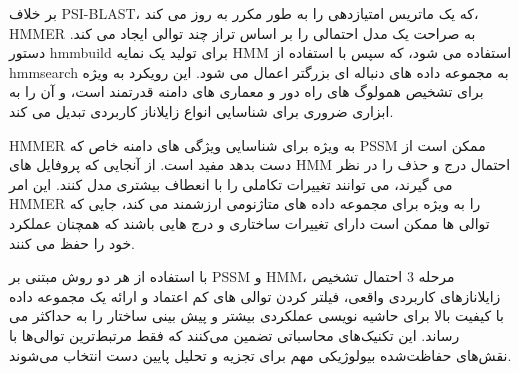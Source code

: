             بر خلاف PSI-BLAST، که یک ماتریس امتیازدهی را به طور مکرر به روز می کند، HMMER به صراحت یک مدل احتمالی را بر اساس تراز چند توالی ایجاد می کند. دستور hmmbuild برای تولید یک نمایه HMM استفاده می شود، که سپس با استفاده از hmmsearch به مجموعه داده های دنباله ای بزرگتر اعمال می شود. این رویکرد به ویژه برای تشخیص همولوگ های راه دور و معماری های دامنه قدرتمند است، و آن را به ابزاری ضروری برای شناسایی انواع زایلاناز کاربردی تبدیل می کند.
            
            HMMER به ویژه برای شناسایی ویژگی های دامنه خاص که PSSM ممکن است از دست بدهد مفید است. از آنجایی که پروفایل های HMM احتمال درج و حذف را در نظر می گیرند، می توانند تغییرات تکاملی را با انعطاف بیشتری مدل کنند. این امر HMMER را به ویژه برای مجموعه داده های متاژنومی ارزشمند می کند، جایی که توالی ها ممکن است دارای تغییرات ساختاری و درج هایی باشند که همچنان عملکرد خود را حفظ می کنند.
            
            با استفاده از هر دو روش مبتنی بر PSSM و HMM، مرحله 3 احتمال تشخیص زایلانازهای کاربردی واقعی، فیلتر کردن توالی های کم اعتماد و ارائه یک مجموعه داده با کیفیت بالا برای حاشیه نویسی عملکردی بیشتر و پیش بینی ساختار را به حداکثر می رساند. این تکنیک‌های محاسباتی تضمین می‌کنند که فقط مرتبط‌ترین توالی‌ها با نقش‌های حفاظت‌شده بیولوژیکی مهم برای تجزیه و تحلیل پایین دست انتخاب می‌شوند.

